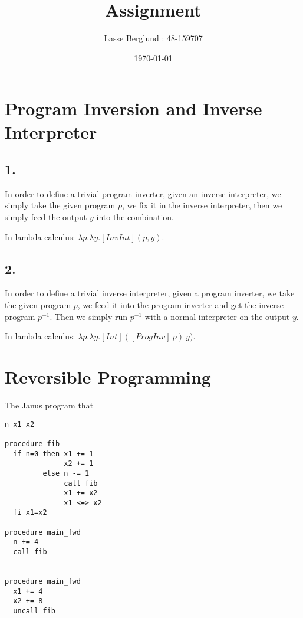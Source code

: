 \documentclass[12pt]{report}
\title{Assignment}
\author{Lasse Berglund : 48-159707}
\date{\today}
\begin{document}
\maketitle

\section*{Program Inversion and Inverse Interpreter}
\subsection*{1.}
  In order to define a trivial program inverter, given an inverse interpreter, we simply take the given program $p$, we fix it in the inverse interpreter, then we simply feed the output $y$ into the combination.

  In lambda calculus: $\lambda p. \lambda y. [InvInt] (p,y)$.

\subsection*{2.}
  In order to define a trivial inverse interpreter, given a program inverter, we take the given program $p$, we feed it into the program inverter and get the inverse program $p^{-1}$. Then we simply run $p^{-1}$ with a normal interpreter on the output $y$.


  In lambda calculus: $\lambda p. \lambda y. [Int] ( [ProgInv] \ p ) \ y)$.


\section*{Reversible Programming}
The Janus program that 
\begin{verbatim}
n x1 x2

procedure fib
  if n=0 then x1 += 1
              x2 += 1
         else n -= 1
              call fib
              x1 += x2
              x1 <=> x2
  fi x1=x2

procedure main_fwd
  n += 4
  call fib


procedure main_fwd
  x1 += 4
  x2 += 8
  uncall fib

\end{verbatim}
\end{document}
